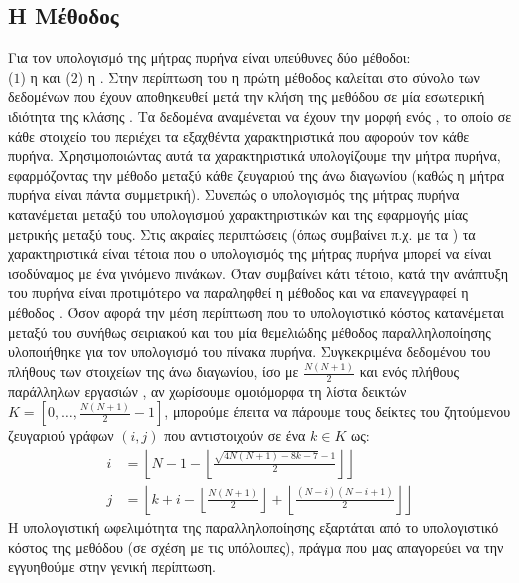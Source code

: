 \subsection{Η Μέθοδος \texttt{}}
Για τον υπολογισμό της μήτρας πυρήνα είναι υπεύθυνες δύο μέθοδοι:\\ ($1$) η \texttt{} και ($2$) η \texttt{}.
Στην περίπτωση του \texttt{} η πρώτη μέθοδος καλείται στο σύνολο των δεδομένων που έχουν αποθηκευθεί μετά την κλήση της μεθόδου \texttt{} σε μία εσωτερική ιδιότητα της κλάσης \texttt{}.
Τα δεδομένα αναμένεται να έχουν την μορφή ενός \texttt{}, το οποίο σε κάθε στοιχείο του περιέχει τα εξαχθέντα χαρακτηριστικά που αφορούν τον κάθε πυρήνα.
Χρησιμοποιώντας αυτά τα χαρακτηριστικά υπολογίζουμε την μήτρα πυρήνα, εφαρμόζοντας την μέθοδο \texttt{} μεταξύ κάθε ζευγαριού της άνω διαγωνίου (καθώς η μήτρα πυρήνα είναι πάντα συμμετρική).
Συνεπώς ο υπολογισμός της μήτρας πυρήνα κατανέμεται μεταξύ του υπολογισμού χαρακτηριστικών και της εφαρμογής μίας μετρικής μεταξύ τους.
Στις ακραίες περιπτώσεις (όπως συμβαίνει π.χ. με τα ) τα χαρακτηριστικά είναι τέτοια που ο υπολογισμός της μήτρας πυρήνα μπορεί να είναι ισοδύναμος με ένα γινόμενο πινάκων.
Όταν συμβαίνει κάτι τέτοιο, κατά την ανάπτυξη του πυρήνα είναι προτιμότερο να παραληφθεί η μέθοδος \texttt{} και να επανεγγραφεί η μέθοδος \texttt{}.
Όσον αφορά την μέση περίπτωση που το υπολογιστικό κόστος κατανέμεται μεταξύ του συνήθως σειριακού \texttt{} και του \texttt{} μία θεμελιώδης μέθοδος παραλληλοποίησης υλοποιήθηκε για τον υπολογισμό του πίνακα πυρήνα.
Συγκεκριμένα δεδομένου του πλήθους των στοιχείων της άνω διαγωνίου, ίσο με $\frac{N(N+1)}{2}$ και ενός πλήθους παράλληλων εργασιών \texttt{}, αν χωρίσουμε ομοιόμορφα τη λίστα δεικτών $K = [0, \dots, \frac{N(N+1)}{2}-1]$, μπορούμε έπειτα να πάρουμε τους δείκτες του ζητούμενου ζευγαριού γράφων $(i,j)$ που αντιστοιχούν σε ένα $k \in K$ ως:
\begin{align}
    i &= \left\lfloor N - 1 - \left\lfloor \frac{\sqrt{4N(N+1) - 8k - 7} - 1}{2}\right\rfloor \right\rfloor\\
    j &= \left\lfloor k + i - \left\lfloor \frac{N(N+1)}{2} \right\rfloor + \left\lfloor \frac{(N-i)(N-i+1)}{2} \right\rfloor \right\rfloor
\end{align}
Η υπολογιστική ωφελιμότητα της παραλληλοποίησης εξαρτάται από το υπολογιστικό κόστος της μεθόδου \texttt{} (σε σχέση με τις υπόλοιπες), πράγμα που μας απαγορεύει να την εγγυηθούμε στην γενική περίπτωση.

